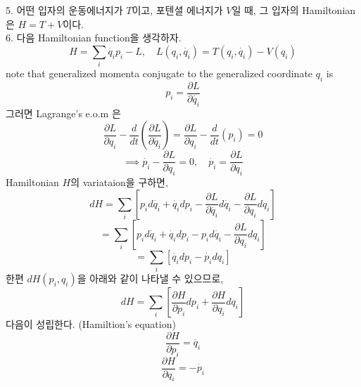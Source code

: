 \documentclass[a4paper,12pt]{article}
\begin{document}
\begin{flushleft}
	5. 어떤 입자의 운동에너지가 $T$이고, 포텐셜 에너지가 $V$일 때, 그 입자의 Hamiltonian은 $H=T+V$이다.\\
	6. 다음 Hamiltonian function을 생각하자.
	$$H=\sum_{i}\dot{q_i}p_i-L, \quad L(q_i,\dot{q_i})=T(q_i,\dot{q_i})-V(q_i)$$
	note that generalized momenta conjugate to the generalized coordinate $q_i$ is
	$$p_i=\frac{\partial L}{\partial \dot{q_i}}$$
	그러면 Lagrange's e.o.m 은
		$$\frac{\partial L}{\partial q_i}-\frac{d}{dt}\left(\frac{\partial L}{\partial \dot{q_i}} \right)=\frac{\partial L}{\partial q_i}-\frac{d}{dt}(p_i)=0 $$
		$$\implies\dot{p_i}-\frac{\partial L}{\partial q_i}=0,\quad \dot{p_i}=\frac{\partial L}{\partial q_i}$$
	Hamiltonian $H$의 variataion을 구하면,
	$$dH=\sum_{i}\left[p_id\dot{q_i}+\dot{q_i}dp_i-\frac{\partial L}{\partial \dot{q_i}}d\dot{q_i}-\frac{\partial L}{\partial q_i}dq_i \right] $$
	$$=\sum_{i}\left[p_id\dot{q_i}+\dot{q_i}dp_i-p_id\dot{q_i}-\frac{\partial L}{\partial q_i}dq_i \right]$$
	$$=\sum_{i}\left[\dot{q_i}dp_i-\dot{p_i}dq_i \right]$$
	한편 $dH(p_i,q_i)$을 아래와 같이 나타낼 수 있으므로,
	$$dH=\sum_{i}\left[\frac{\partial H}{\partial p_i}dp_i+\frac{\partial H}{\partial q_i}dq_i \right] $$
	다음이 성립한다. (Hamiltion's equation)
	$$\frac{\partial H}{\partial p_i}=\dot{q_i}$$
	$$\frac{\partial H}{\partial q_i}=-\dot{p_i}$$
\end{flushleft}
\end{document}
